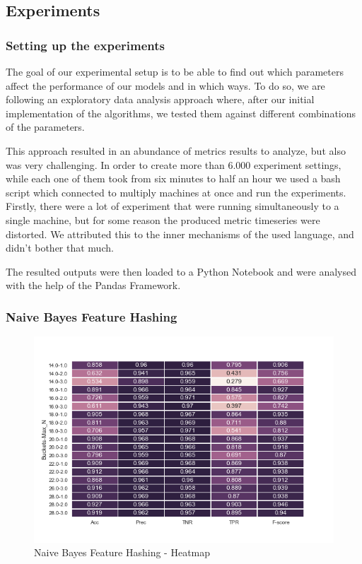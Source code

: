 \documentclass[12pt]{article}
\begin{document}
\subsection{Experiments}

\subsubsection{Setting up the experiments}
      The goal of our experimental setup is to be able to find out which parameters affect the performance of our models and in which ways. To do so, we are following an exploratory data analysis approach where, after our initial implementation of the algorithms, we tested them against different combinations of the parameters. 

This approach resulted in an abundance of metrics results to analyze, but also was very challenging. In order to create more than 6.000 experiment settings, while each one of them took from six minutes to half an hour we used a bash script which connected to multiply machines at once and run the experiments. Firstly, there were a lot of experiment that were running simultaneously to a single machine, but for some reason the produced metric timeseries were distorted. We attributed this to the inner mechanisms of the used language, and didn't bother that much.
       
The resulted outputs were then loaded to a Python Notebook and were analysed with the help of the Pandas Framework.

\subsubsection{Naive Bayes Feature Hashing}

\begin{figure}[h]
    \centering
    \includegraphics[scale=0.8]{./SpamFilter/code/nbfh}
    \caption{Naive Bayes Feature Hashing - Heatmap}
    \label{nbfh}
\end{figure}
\end{document}
